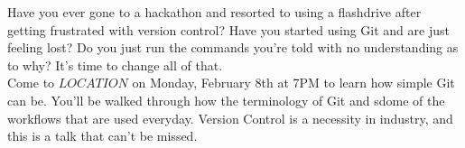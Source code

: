 \documentclass[12pt]{article}
\begin{document}
	\maketitle
	Have you ever gone to a hackathon and resorted to using a flashdrive after getting frustrated with version control? Have you started using Git and are just feeling lost? Do you just run the commands you're told with no understanding as to why? It's time to change all of that.\\
	\linebreak
	Come to $LOCATION$ on Monday, February 8th at 7PM to learn how simple Git can be. You'll be walked through how the terminology of Git and sdome of the workflows that are used everyday. Version Control is a necessity in industry, and this is a talk that can't be missed.\\
\end{document}
